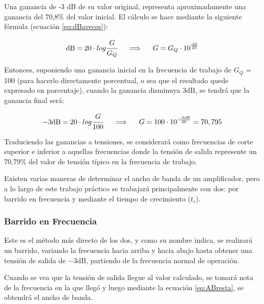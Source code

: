 Una ganancia de -3 dB de su valor original, representa aproximadamente una ganancia del 70,8$\%$ del valor inicial. El cálculo se hace mediante la siguiente fórmula (ecuación \ref{eq:dBaveces}):

\begin{equation}
    \mathrm{dB} = 20 \cdot log \cfrac{G}{G_Q}
    \hspace{0.5cm}\Longrightarrow\hspace{0.5cm}
    G = G_Q \cdot 10^{\frac{\mathrm{dB}}{20}}
    \label{eq:dBaveces}
\end{equation}

Entonces, suponiendo una ganancia inicial en la frecuencia de trabajo de $G_Q$ = 100 (para hacerlo directamente porcentual, o sea que el resultado quede expresado en porcentaje), cuando la ganancia disminuya $3\mathrm{dB}$, se tendrá que la ganancia final será:

\begin{equation}
    -3 \mathrm{dB} = 20 \cdot log \cfrac{G}{100}
    \hspace{0.5cm}\Longrightarrow\hspace{0.5cm}
    G = 100 \cdot 10^{\frac{-3 \mathrm{dB}}{20}} = 70,795
    \label{eq:Gfinal}
\end{equation}

Traduciendo las ganancias a tensiones, se considerará como frecuencias de corte superior e inferior a aquellas frecuencias donde la tensión de salida represente un 70,79$\%$ del valor de tensión típico en la frecuencia de trabajo.

Existen varias maneras de determinar el ancho de banda de un amplificador, pero a lo largo de este trabajo práctico se trabajará principalmente con dos: por barrido en frecuencia y mediante el tiempo de crecimiento ($t_c$).

\subsubsection{Barrido en Frecuencia}

Este es el método más directo de los dos, y como su nombre indica, se realizará un barrido, variando la frecuencia hacia arriba y hacia abajo hasta obtener una tensión de salida de $-3\mathrm{dB}$, partiendo de la frecuencia normal de operación.

Cuando se vea que la tensión de salida llegue al valor calculado, se tomará nota de la frecuencia en la que llegó y luego mediante la ecuación \ref{eq:ABresta}, se obtendrá el ancho de banda.

